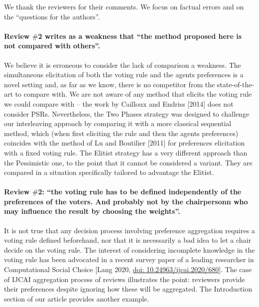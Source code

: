 \documentclass{article}
\newcommand{\commentOC}[1]{\textcolor{blue}{\small$\big[$OC: #1$\big]$}}
\begin{document}
\addtocounter{pagecount}{-4}

	We thank the reviewers for their comments. We focus on factual errors and on the “questions for the authors”. 

\paragraph{Review $\#$2 writes as a weakness that “the method proposed here is not compared with others”.}
We believe it is erroneous to consider the lack of comparison a weakness. The simultaneous elicitation of both the voting rule and the agents preferences is a novel setting and, as far as we know, there is no competitor from the state-of-the-art to compare with. 
We are not aware of any method that elicits the voting rule we could compare with – the work by Cailloux and Endriss [2014] does not consider PSRs. Nevertheless, the Two Phases strategy was designed to challenge our interleaving approach by comparing it with a more classical sequential method, which (when first eliciting the rule and then the agents preferences) coincides with the method of Lu and Boutilier [2011] for preferences elicitation with a fixed voting rule.
The Elitist strategy has a very different approach than the Pessimistic one, to the point that it cannot be considered a variant. They are compared in a situation specifically tailored to advantage the Elitist. 

\paragraph{Review $\#$2: “the voting rule has to be defined independently of the preferences of the voters. And probably not by the chairpersonn who may influence the result by choosing the weights”.}
It is not true that any decision process involving preference aggregation requires a voting rule defined beforehand, nor that it is necessarily a bad idea to let a chair decide on the voting rule. The interest of considering incomplete knowledge in the voting rule has been advocated in a recent survey paper of a leading researcher in Computational Social Choice [Lang 2020, \href{https://doi.org/10.24963/ijcai.2020/680}{doi: 10.24963/ijcai.2020/680}]. The case of IJCAI aggregation process of reviews illustrates the point: reviewers provide their preferences despite ignoring how these will be aggregated. The Introduction section of our article provides another example.
\end{document}

